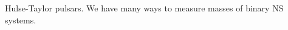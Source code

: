 \documentclass[main.tex]{subfiles}
\begin{document}

Hulse-Taylor pulsars.
We have many ways to measure masses of binary NS systems. 
\end{document}
